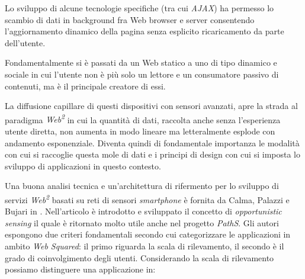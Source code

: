 Lo sviluppo di alcune tecnologie specifiche (tra cui \emph{AJAX}) ha permesso lo scambio di dati in background fra Web browser e server consentendo l'aggiornamento dinamico della pagina senza esplicito ricaricamento da parte dell'utente.

Fondamentalmente si è passati da un Web statico a uno di tipo dinamico e sociale in cui l'utente non è più solo un lettore e un consumatore passivo di contenuti, ma è il principale creatore di essi.

La diffusione capillare di questi dispositivi con sensori avanzati, apre la strada al paradigma \emph{Web\textsuperscript{2}} in cui la quantità di dati, raccolta anche senza l'esperienza utente diretta, non aumenta in modo lineare ma letteralmente esplode con andamento esponenziale. Diventa quindi di fondamentale importanza le modalità con cui si raccoglie questa mole di dati e i principi di design con cui si imposta lo sviluppo di applicazioni in questo contesto.

Una buona analisi tecnica e un'architettura di rifermento per lo sviluppo di servizi \emph{Web\textsuperscript{2}} basati su reti di sensori \emph{smartphone} è fornita da Calma, Palazzi e Bujari in \cite{web2palazzi}. Nell'articolo è introdotto e sviluppato il concetto di \emph{opportunistic sensing} il quale è ritornato molto utile anche nel progetto \emph{PathS}. Gli autori espongono due criteri fondamentali secondo cui categorizzare le applicazioni in ambito \emph{Web Squared}: il primo riguarda la scala di rilevamento, il secondo è il grado di coinvolgimento degli utenti. Considerando la scala di rilevamento possiamo distinguere una applicazione in:

